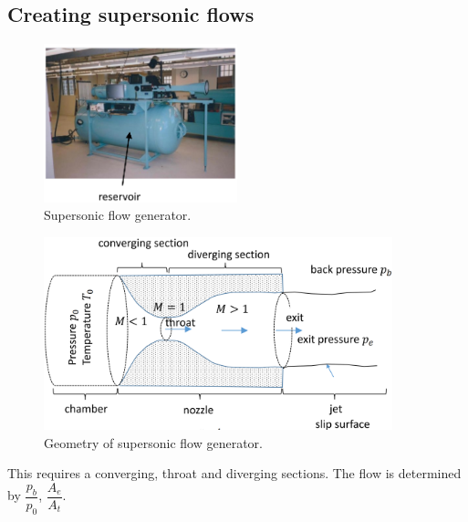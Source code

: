 \subsection{Creating supersonic flows}
\begin{figure}[H]
    \centering
    \includegraphics[width = 0.5\textwidth]{./img/diagram53.png}
    \caption{Supersonic flow generator.}
\end{figure}
\begin{figure}[H]
    \centering
    \includegraphics[width = 0.9\textwidth]{./img/diagram54.png}
    \caption{Geometry of supersonic flow generator.}
\end{figure}
This requires a converging, throat and diverging sections. The flow is determined by $\dfrac{p_b}{p_0}$, $\dfrac{A_e}{A_t}$.
